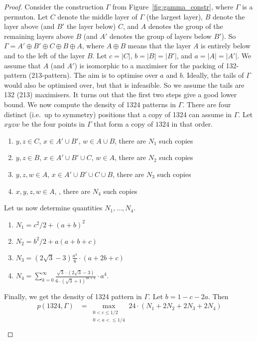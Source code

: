 \documentclass[12pt, a4paper, twoside]{report}
\begin{document}
\begin{proof}
  Consider the construction $\Gamma$ from Figure~\ref{fig:gamma_constr}, where $\Gamma$ is a permuton. Let $C$ denote the middle layer of $\Gamma$ (the largest layer), $B$ denote the layer above (and $B'$ the layer below) $C$, and $A$ denotes the group of the remaining layers above $B$ (and $A'$ denotes the group of layers below $B'$). So $\Gamma = A' \oplus B' \oplus C \oplus B \oplus A$, where $A \oplus B$ means that the layer $A$ is entirely below and to the left of the layer $B$. Let $c = |C|$, $b = |B| = |B'|$, and $a =  |A| = |A'|$. We assume that $A$ (and $A'$) is isomorphic to a maximiser for the packing of 132-pattern (213-pattern). The aim is to optimise over $a$ and $b$. Ideally, the tails of $\Gamma$ would also be optimised over, but that is infeasible. So we assume the tails are 132 (213) maximisers. It turns out that the first two steps give a good lower bound. We now compute the density of 1324 patterns in $\Gamma$. There are four distinct (i.e.~up to symmetry) positions that a copy of 1324 can assume in $\Gamma$. Let $xyzw$ be the four points in $\Gamma$ that form a copy of $1324$ in that order.
\begin{enumerate}
\item $y,z \in C$, $x \in A' \cup B'$, $w \in A \cup B$, there are $N_1$ such copies
\item $y,z \in B$, $x \in A' \cup B' \cup C$, $w \in A$, there are $N_2$ such copies
\item $y,z,w \in A$, $x \in A' \cup B' \cup C \cup B$, there are $N_3$ such copies
\item $x,y,z,w \in A$, , there are $N_4$ such copies
\end{enumerate}
Let us now determine quantities $N_1,\ldots, N_4$. 
\begin{enumerate}
\item $N_1 = c^2/2 + (a+b)^2$
\item $N_2 = b^2/2 + a(a+b+c)$
\item $N_3 = (2\sqrt{3}-3)\frac{a^3}{6}\cdot (a+2b+c)$
\item $N_4 = \sum_{k=0}^\infty \frac{\sqrt{3}\cdot(2\sqrt{3}-3)}{6 \cdot (\sqrt{3}+1)^{4k+4}}\cdot a^4$.
\end{enumerate}
Finally, we get the density of 1324 pattern in $\Gamma$. Let $b = 1-c-2a$. Then
\begin{align*}
p(1324, \Gamma) &= \max_{\substack{0< c\leq 1/2\\ 0 < a < \leq 1/4}}24\cdot(N_1 + 2N_2 + 2N_3 + 2N_4)\\

\end{align*}
\end{proof}
\end{document}
